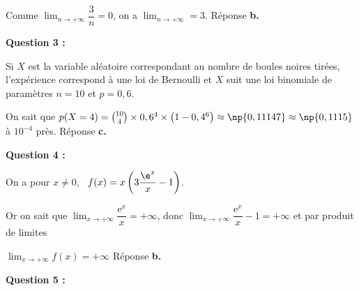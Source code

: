 Comme $\displaystyle\lim_{n \to + \infty} \dfrac{3}{n} = 0$, on a $\displaystyle\lim_{n \to + \infty} = 3$. Réponse \textbf{b.}

\medskip

\textbf{Question 3 :}

%
Si $X$ est la variable aléatoire correspondant au nombre de boules noires tirées, l'expérience correspond à une loi de Bernoulli  et $X$ suit une loi binomiale de paramètres $n = 10$ et $p = 0,6$.

On sait que $p(X = 4) = \binom{10}{4} \times 0,6^4 \times \left(1 - 0,4^6\right) \approx \np{0,11147} \approx \np{0,1115}$ à $10^{-4}$ près. Réponse \textbf{c.~~}
\medskip

\textbf{Question 4 :}


On a pour $x \ne 0$, \, $f(x) = x\left(3\dfrac{\e^x}{x}  - 1\right)$.

Or on sait que $\displaystyle\lim_{x \to + \infty} \dfrac{\text{e}^x}{x} = + \infty$, donc 
$\displaystyle\lim_{x \to + \infty} \dfrac{\text{e}^x}{x} - 1 = + \infty$ et par produit de limites
 
$\displaystyle\lim_{x \to + \infty} f(x) = + \infty$ Réponse \textbf{b.}
\medskip

\textbf{Question 5 :}

